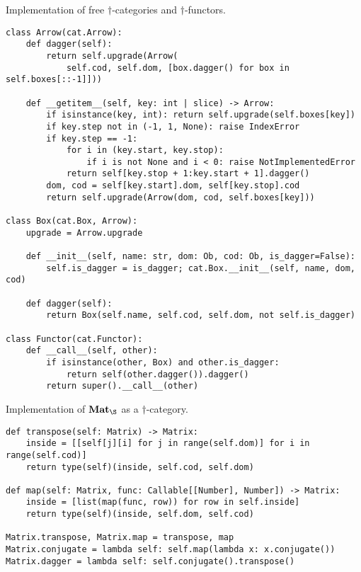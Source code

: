 \begin{python}
{\normalfont Implementation of free $\dagger$-categories and $\dagger$-functors.}
\begin{verbatim}
class Arrow(cat.Arrow):
    def dagger(self):
        return self.upgrade(Arrow(
            self.cod, self.dom, [box.dagger() for box in self.boxes[::-1]]))

    def __getitem__(self, key: int | slice) -> Arrow:
        if isinstance(key, int): return self.upgrade(self.boxes[key])
        if key.step not in (-1, 1, None): raise IndexError
        if key.step == -1:
            for i in (key.start, key.stop):
                if i is not None and i < 0: raise NotImplementedError
            return self[key.stop + 1:key.start + 1].dagger()
        dom, cod = self[key.start].dom, self[key.stop].cod
        return self.upgrade(Arrow(dom, cod, self.boxes[key]))

class Box(cat.Box, Arrow):
    upgrade = Arrow.upgrade

    def __init__(self, name: str, dom: Ob, cod: Ob, is_dagger=False):
        self.is_dagger = is_dagger; cat.Box.__init__(self, name, dom, cod)

    def dagger(self):
        return Box(self.name, self.cod, self.dom, not self.is_dagger)

class Functor(cat.Functor):
    def __call__(self, other):
        if isinstance(other, Box) and other.is_dagger:
            return self(other.dagger()).dagger()
        return super().__call__(other)
\end{verbatim}
\end{python}

\begin{python}
{\normalfont Implementation of $\mathbf{Mat}_\S$ as a $\dagger$-category.}

\begin{verbatim}
def transpose(self: Matrix) -> Matrix:
    inside = [[self[j][i] for j in range(self.dom)] for i in range(self.cod)]
    return type(self)(inside, self.cod, self.dom)

def map(self: Matrix, func: Callable[[Number], Number]) -> Matrix:
    inside = [list(map(func, row)) for row in self.inside]
    return type(self)(inside, self.dom, self.cod)

Matrix.transpose, Matrix.map = transpose, map
Matrix.conjugate = lambda self: self.map(lambda x: x.conjugate())
Matrix.dagger = lambda self: self.conjugate().transpose()
\end{verbatim}
\end{python}

